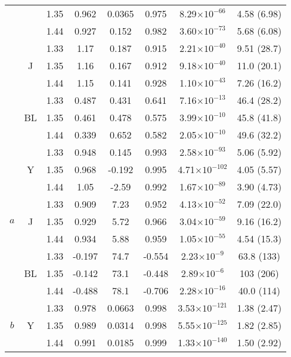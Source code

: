\begin{table}[htb!]
\begin{tabular}{|ccc|ccccc|}
        & & 1.35 & 0.962 & 0.0365 & 0.975 & 8.29$\times 10^{-66}$ & 4.58 (6.98) \\
        & & 1.44 & 0.927 & 0.152 & 0.982 & 3.60$\times 10^{-73}$ & 5.68 (6.08) \\
        \cline{2-8}
        & \multirow{3}{*}{J} & 1.33 & 1.17 & 0.187 & 0.915 & 2.21$\times 10^{-40}$ & 9.51 (28.7) \\
        & & 1.35 & 1.16 & 0.167 & 0.912 & 9.18$\times 10^{-40}$ & 11.0 (20.1) \\
        & & 1.44 & 1.15 & 0.141 & 0.928 & 1.10$\times 10^{-43}$ & 7.26 (16.2) \\
        \cline{2-8}
        & \multirow{3}{*}{BL} & 1.33 & 0.487 & 0.431 & 0.641 & 7.16$\times 10^{-13}$ & 46.4 (28.2) \\
        & & 1.35 & 0.461 & 0.478 & 0.575 & 3.99$\times 10^{-10}$ & 45.8 (41.8) \\
        & & 1.44 & 0.339 & 0.652 & 0.582 & 2.05$\times 10^{-10}$ & 49.6 (32.2) \\
        \hline
        \multirow{9}{*}{$a$} & \multirow{3}{*}{Y} & 1.33 & 0.948 & 0.145 & 0.993 & 2.58$\times 10^{-93}$ & 5.06 (5.92) \\
        & & 1.35 & 0.968 & -0.192 & 0.995 & 4.71$\times 10^{-102}$ & 4.05 (5.57) \\
        & & 1.44 & 1.05 & -2.59 & 0.992 & 1.67$\times 10^{-89}$ & 3.90 (4.73) \\
        \cline{2-8}
        & \multirow{3}{*}{J} & 1.33 & 0.909 & 7.23 & 0.952 & 4.13$\times 10^{-52}$ & 7.09 (22.0) \\
        & & 1.35 & 0.929 & 5.72 & 0.966 & 3.04$\times 10^{-59}$ & 9.16 (16.2) \\
        & & 1.44 & 0.934 & 5.88 & 0.959 & 1.05$\times 10^{-55}$ & 4.54 (15.3) \\
        \cline{2-8}
        & \multirow{3}{*}{BL} & 1.33 & -0.197 & 74.7 & -0.554 & 2.23$\times 10^{-9}$ & 63.8 (133) \\
        & & 1.35 & -0.142 & 73.1 & -0.448 & 2.89$\times 10^{-6}$ & 103 (206) \\
        & & 1.44 & -0.488 & 78.1 & -0.706 & 2.28$\times 10^{-16}$ & 40.0 (114) \\
        \hline
        \multirow{9}{*}{$b$} & \multirow{3}{*}{Y} & 1.33 & 0.978 & 0.0663 & 0.998 & 3.53$\times 10^{-121}$ & 1.38 (2.47) \\
        & & 1.35 & 0.989 & 0.0314 & 0.998 & 5.55$\times 10^{-125}$ & 1.82 (2.85) \\
        & & 1.44 & 0.991 & 0.0185 & 0.999 & 1.33$\times 10^{-140}$ & 1.50 (2.92) \\

\end{tabular}
\end{table}
